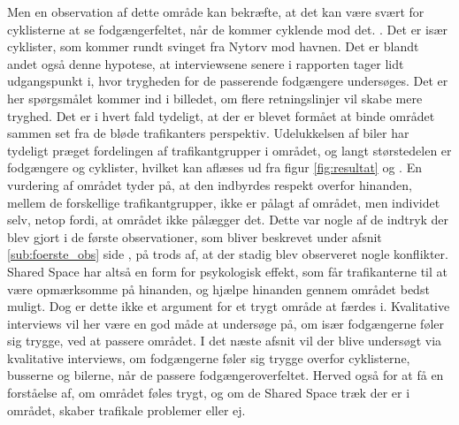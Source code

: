 Men en observation af dette område kan bekræfte, at det kan være svært for cyklisterne at se fodgængerfeltet, når de kommer cyklende mod det. . Det er især cyklister, som kommer rundt svinget fra Nytorv mod havnen. Det er blandt andet også denne hypotese, at interviewsene senere i rapporten tager lidt udgangspunkt i, hvor trygheden for de passerende fodgængere undersøges.
Det er her spørgsmålet kommer ind i billedet, om flere retningslinjer vil skabe mere tryghed. Det er i hvert fald tydeligt, at der er blevet formået at binde området sammen set fra de bløde trafikanters perspektiv. Udelukkelsen af biler har tydeligt præget fordelingen af trafikantgrupper i området, og langt størstedelen er fodgængere og cyklister, hvilket kan aflæses ud fra figur \cref{fig:resultat} og \pageref{fig:resultat}.
En vurdering af området tyder på, at den indbyrdes respekt overfor hinanden, mellem de forskellige trafikantgrupper, ikke er pålagt af området, men individet selv, netop fordi, at området ikke pålægger det. Dette var nogle af de indtryk der blev gjort i de første observationer, som bliver beskrevet under afsnit \cref{sub:foerste_obs} side \pageref{sub:foerste_obs}, på trods af, at der stadig blev observeret nogle konflikter. Shared Space har altså en form for psykologisk effekt, som får trafikanterne til at være opmærksomme på hinanden, og hjælpe hinanden gennem området bedst muligt. Dog er dette ikke et argument for et trygt område at færdes i. Kvalitative interviews vil her være en god måde at undersøge på, om især fodgængerne føler sig trygge, ved at passere området.
I det næste afsnit vil der blive undersøgt via kvalitative interviews, om fodgængerne føler sig trygge overfor cyklisterne, busserne og bilerne, når de passere fodgængeroverfeltet. Herved også for at få en forståelse af, om området føles trygt, og om de Shared Space træk der er i området, skaber trafikale problemer eller ej.
